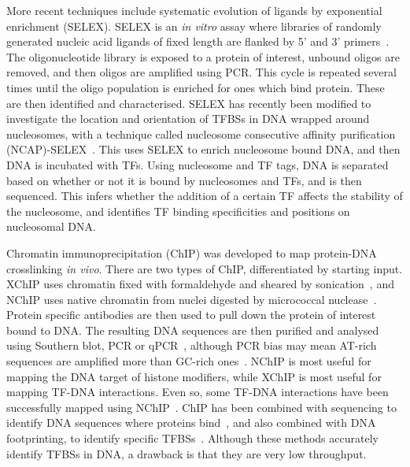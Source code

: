 More recent techniques include systematic evolution of ligands by exponential enrichment (SELEX).
SELEX is an \textit{in vitro} assay where libraries of randomly generated nucleic acid ligands of fixed length are flanked by 5' and 3' primers~\autocite{tuerkSystematicEvolutionLigands1990}.
The oligonucleotide library is exposed to a protein of interest, unbound oligos are removed, and then oligos are amplified using PCR.
This cycle is repeated several times until the oligo population is enriched for ones which bind protein.
These are then identified and characterised.
SELEX has recently been modified to investigate the location and orientation of TFBSs in DNA wrapped around nucleosomes, with a technique called nucleosome consecutive affinity purification (NCAP)\hyp{}SELEX~\autocite{zhuInteractionLandscapeTranscription2018}.
This uses SELEX to enrich nucleosome bound DNA, and then DNA is incubated with TFs.
Using nucleosome and TF tags, DNA is separated based on whether or not it is bound by nucleosomes and TFs, and is then sequenced.
This infers whether the addition of a certain TF affects the stability of the nucleosome, and identifies TF binding specificities and positions on nucleosomal DNA.

Chromatin immunoprecipitation (ChIP) was developed to map protein\hyp{}DNA crosslinking \textit{in vivo}.
There are two types of ChIP, differentiated by starting input.
XChIP uses chromatin fixed with formaldehyde and sheared by sonication~\autocite{solomonMappingProteinDNAInteractions1988,orlandoMappingChromosomalProteins2000}, and NChIP uses native chromatin from nuclei digested by micrococcal nuclease~\autocite{hebbesDirectLinkCore1988}.
Protein specific antibodies are then used to pull down the protein of interest bound to DNA.
The resulting DNA sequences are then purified and analysed using Southern blot, PCR or qPCR~\autocite{dasChromatinImmunoprecipitationAssay2004}, although PCR bias may mean AT\hyp{}rich sequences are amplified more than GC\hyp{}rich ones~\autocite{weinmannIdentificationUnknownTarget2002}.
NChIP is most useful for mapping the DNA target of histone modifiers, while XChIP is most useful for mapping TF\hyp{}DNA interactions.
Even so, some TF\hyp{}DNA interactions have been successfully mapped using NChIP~\autocite{gregoryDNAMethylationLinked2001}.
ChIP has been combined with sequencing to identify DNA sequences where proteins bind~\autocite{weinmannUseChromatinImmunoprecipitation2001}, and also combined with DNA footprinting, to identify specific TFBSs~\autocite{leekangCombiningChromatinImmunoprecipitation2002}.
Although these methods accurately identify TFBSs in DNA, a drawback is that they are very low throughput.

